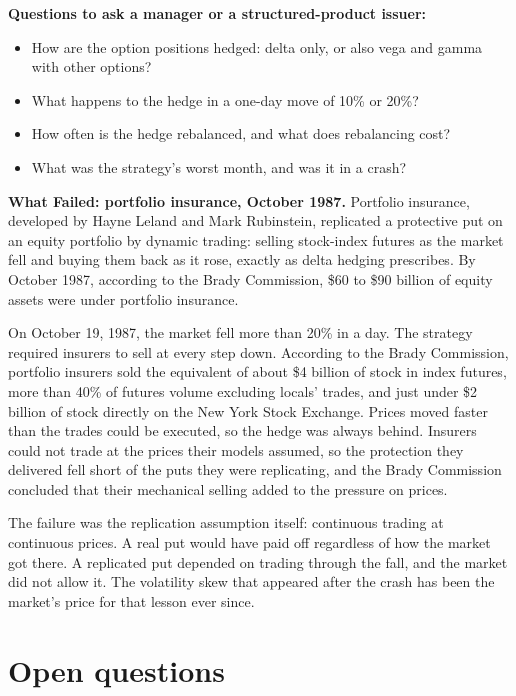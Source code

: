\textbf{Questions to ask a manager or a structured-product issuer:}

\begin{itemize}
  \item How are the option positions hedged: delta only, or also vega and gamma with other options?
  \item What happens to the hedge in a one-day move of 10\% or 20\%?
  \item How often is the hedge rebalanced, and what does rebalancing cost?
  \item What was the strategy's worst month, and was it in a crash?
\end{itemize}

\begin{callout}
\textbf{What Failed: portfolio insurance, October 1987.} Portfolio insurance, developed by Hayne Leland and Mark Rubinstein, replicated a protective put on an equity portfolio by dynamic trading: selling stock-index futures as the market fell and buying them back as it rose, exactly as delta hedging prescribes. By October 1987, according to the Brady Commission, \$60 to \$90 billion of equity assets were under portfolio insurance.

On October 19, 1987, the market fell more than 20\% in a day. The strategy required insurers to sell at every step down. According to the Brady Commission, portfolio insurers sold the equivalent of about \$4 billion of stock in index futures, more than 40\% of futures volume excluding locals' trades, and just under \$2 billion of stock directly on the New York Stock Exchange. Prices moved faster than the trades could be executed, so the hedge was always behind. Insurers could not trade at the prices their models assumed, so the protection they delivered fell short of the puts they were replicating, and the Brady Commission concluded that their mechanical selling added to the pressure on prices.

The failure was the replication assumption itself: continuous trading at continuous prices. A real put would have paid off regardless of how the market got there. A replicated put depended on trading through the fall, and the market did not allow it. The volatility skew that appeared after the crash has been the market's price for that lesson ever since.
\end{callout}

\section{Open questions}
\label{sec:15-open}

